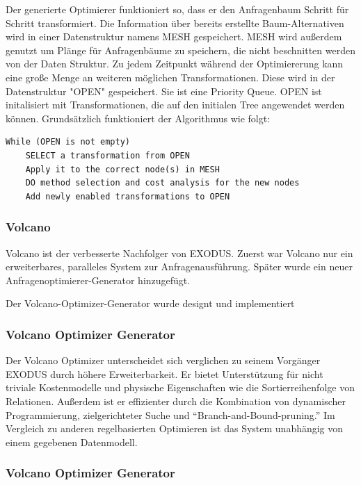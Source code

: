 Der generierte Optimierer funktioniert so, dass er den Anfragenbaum Schritt für Schritt transformiert. Die Information über bereits erstellte Baum-Alternativen wird in einer Datenstruktur namens MESH gespeichert. MESH wird außerdem genutzt um Plänge für Anfragenbäume zu speichern, die nicht beschnitten werden von der Daten Struktur. Zu jedem Zeitpunkt während der Optimiererung kann eine große Menge an weiteren möglichen Transformationen. Diese wird in der Datenstruktur "OPEN" gespeichert. Sie ist eine Priority Queue. OPEN ist initalisiert mit Transformationen, die auf den initialen Tree angewendet werden können. Grundsätzlich funktioniert der Algorithmus wie folgt:

\begin{lstlisting}[caption={Exekution in EXODUS}]
While (OPEN is not empty)
	SELECT a transformation from OPEN
	Apply it to the correct node(s) in MESH
	DO method selection and cost analysis for the new nodes
	Add newly enabled transformations to OPEN

\end{lstlisting}

\subsubsection{Volcano}

Volcano ist der verbesserte Nachfolger von EXODUS. Zuerst war Volcano nur ein erweiterbares, paralleles System zur Anfragenausführung. Später wurde ein neuer Anfragenoptimierer-Generator hinzugefügt. 

Der Volcano-Optimizer-Generator wurde designt und implementiert 





\subsubsection{Volcano Optimizer Generator}

Der Volcano Optimizer unterscheidet sich verglichen zu seinem Vorgänger EXODUS durch höhere Erweiterbarkeit. Er bietet Unterstützung für nicht triviale Kostenmodelle und physische Eigenschaften wie die Sortierreihenfolge von Relationen. Außerdem ist er effizienter durch die Kombination von dynamischer Programmierung, zielgerichteter Suche und “Branch-and-Bound-pruning.” Im Vergleich zu anderen regelbasierten Optimieren ist das System unabhängig von einem gegebenen Datenmodell.

\subsubsection{Volcano Optimizer Generator}

